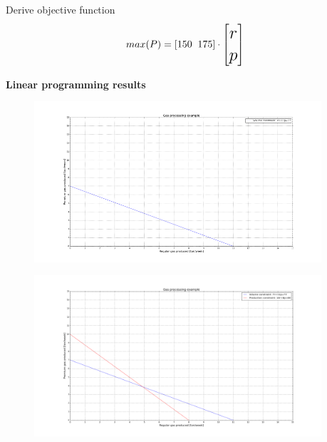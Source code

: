 \documentclass[aspectratio=1610,pdftex,dvipsnames,compress,xcolor={dvipsnames}]{beamer}
\begin{document}
\begin{frame}{Derive objective function}
    \begin{equation}
        \LARGE
        max(P) = [150 \; \; 175]
            \cdot 
        \begin{bmatrix} r \\ p \end{bmatrix}
    \end{equation}
\end{frame}


\begin{frame}[plain]{}
    \centering\Large\textbf{Linear programming results}
\end{frame}


\addtocounter{framenumber}{-1} 
\begin{frame}{}
    \begin{figure}
        \centering
        \includegraphics[width=0.95\textwidth]{gas.volume.jpg}
    \end{figure}
\end{frame}


\begin{frame}{}
    \begin{figure}
        \centering
        \includegraphics[width=0.95\textwidth]{gas.production.jpg}
    \end{figure}
\end{frame}
\end{document}
